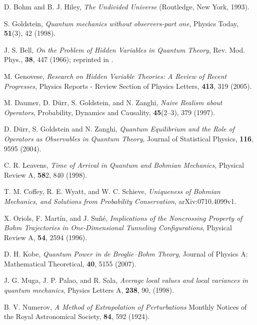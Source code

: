 \documentclass[onecolumn,nofootinbib, secnumarabic, amsmath, nobibnotes,12pt,aps,pra]{revtex4-1}
\begin{document}
\begin{thebibliography}{999}
D. Bohm and B. J. Hiley, \emph{The Undivided Universe} (Routledge, New York, 1993).

S. Goldstein, \emph{Quantum mechanics without observers-part one}, Physics Today, \textbf{51}(3),  42 (1998).

J. S. Bell, \emph{On the Problem of Hidden Variables in Quantum Theory}, Rev. Mod. Phys., \textbf{38},  447 (1966); reprinted in \cite{om.Bell1987}.

M. Genovese, \emph{Research on Hidden Variable Theories: A Review of Recent Progresses}, Physics Reports - Review Section of Physics Letters, \textbf{413},  319 (2005).

M. Daumer, D. D\"{u}rr, S. Goldstein, and N. Zanghi, \emph{Naive Realism about Operators}, Probability, Dynamics and Causality, \textbf{45}(2--3),  379 (1997).

D. D\"{u}rr, S. Goldstein and N. Zanghi, \emph{Quantum Equilibrium and the Role of Operators as Observables in Quantum Theory}, Journal of Statistical Physics, \textbf{116},  9595 (2004).

C. R. Leavens, \emph{Time of Arrival in Quantum and Bohmian Mechanics}, Physical Review A, \textbf{58}2,  840 (1998).

T. M. Coffey, R. E. Wyatt, and W. C. Schieve, \emph{Uniqueness of Bohmian Mechanics, and Solutions from Probability Conservation}, arXiv:0710.4099v1.

X. Oriols, F. Mart\'{i}n, and J. Su\~{n}\'{e}, \emph{Implications of the Noncrossing Property of Bohm Trajectories in One-Dimensional Tunneling Configurations}, Physical Review A, \textbf{54},  2594 (1996).

D. H. Kobe, \emph{Quantum Power in de Broglie--Bohm Theory}, Journal of Physics A: Mathematical Theoretical, \textbf{40},  5155 (2007).

J. G. Muga, J. P. Palao, and R. Sala, \emph{ Average local values and local variances in quantum mechanics},  Physics Letters A, {\bf 238},  90, (1998).

B. V. Numerov, \emph{A Method of Extrapolation of Perturbations} Monthly Notices of the Royal Astronomical Society, \textbf{84},  592 (1924).


\end{thebibliography}
\end{document}
